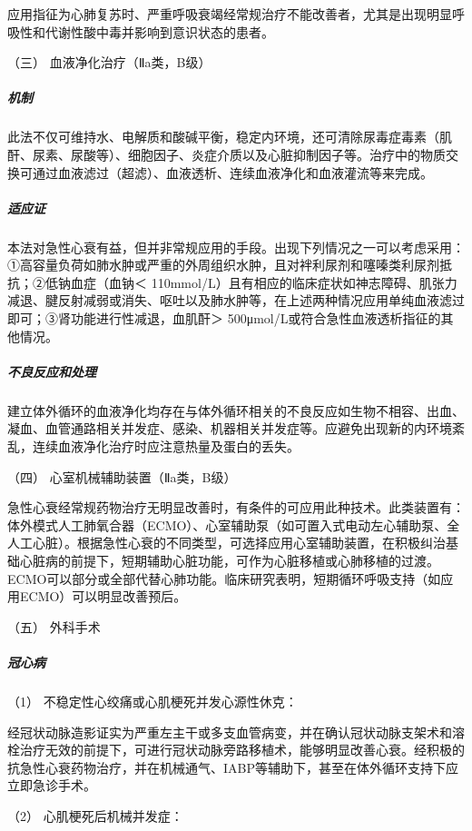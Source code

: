 应用指征为心肺复苏时、严重呼吸衰竭经常规治疗不能改善者，尤其是出现明显呼吸性和代谢性酸中毒并影响到意识状态的患者。

\hypertarget{text00071.htmlux5cux23CHP3-2-5-5-6-3}{}
（三） 血液净化治疗（Ⅱa类，B级）

\subparagraph{机制}

此法不仅可维持水、电解质和酸碱平衡，稳定内环境，还可清除尿毒症毒素（肌酐、尿素、尿酸等）、细胞因子、炎症介质以及心脏抑制因子等。治疗中的物质交换可通过血液滤过（超滤）、血液透析、连续血液净化和血液灌流等来完成。

\subparagraph{适应证}

本法对急性心衰有益，但并非常规应用的手段。出现下列情况之一可以考虑采用：①高容量负荷如肺水肿或严重的外周组织水肿，且对袢利尿剂和噻嗪类利尿剂抵抗；②低钠血症（血钠＜
110mmol/L）且有相应的临床症状如神志障碍、肌张力减退、腱反射减弱或消失、呕吐以及肺水肿等，在上述两种情况应用单纯血液滤过即可；③肾功能进行性减退，血肌酐＞
500μmol/L或符合急性血液透析指征的其他情况。

\subparagraph{不良反应和处理}

建立体外循环的血液净化均存在与体外循环相关的不良反应如生物不相容、出血、凝血、血管通路相关并发症、感染、机器相关并发症等。应避免出现新的内环境紊乱，连续血液净化治疗时应注意热量及蛋白的丢失。

\hypertarget{text00071.htmlux5cux23CHP3-2-5-5-6-4}{}
（四） 心室机械辅助装置（Ⅱa类，B级）

急性心衰经常规药物治疗无明显改善时，有条件的可应用此种技术。此类装置有：体外模式人工肺氧合器（ECMO）、心室辅助泵（如可置入式电动左心辅助泵、全人工心脏）。根据急性心衰的不同类型，可选择应用心室辅助装置，在积极纠治基础心脏病的前提下，短期辅助心脏功能，可作为心脏移植或心肺移植的过渡。ECMO可以部分或全部代替心肺功能。临床研究表明，短期循环呼吸支持（如应用ECMO）可以明显改善预后。

\hypertarget{text00071.htmlux5cux23CHP3-2-5-5-6-5}{}
（五） 外科手术

\subparagraph{冠心病}

\hypertarget{text00071.htmlux5cux23CHP3-2-5-5-6-5-1-1}{}
（1） 不稳定性心绞痛或心肌梗死并发心源性休克：

经冠状动脉造影证实为严重左主干或多支血管病变，并在确认冠状动脉支架术和溶栓治疗无效的前提下，可进行冠状动脉旁路移植术，能够明显改善心衰。经积极的抗急性心衰药物治疗，并在机械通气、IABP等辅助下，甚至在体外循环支持下应立即急诊手术。

\hypertarget{text00071.htmlux5cux23CHP3-2-5-5-6-5-1-2}{}
（2） 心肌梗死后机械并发症：

